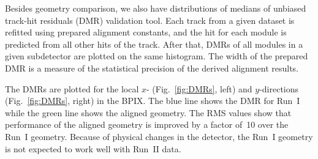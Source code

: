 Besides geometry comparison, we also have distributions of medians of unbiased track-hit residuals (DMR) validation tool. Each track from a given dataset is refitted using prepared alignment constants, and the hit for each module is predicted from all other hits of the track. After that, DMRs of all modules in a given subdetector are plotted on the same histogram. The width of the prepared DMR is a measure of the statistical precision of the derived alignment results. 


The DMRs are plotted for the local $x$- (Fig.~\ref{fig:DMRs}, left) and $y$-directions (Fig.~\ref{fig:DMRs}, right) in the BPIX. The blue line shows the DMR for Run~I while the green line shows the aligned geometry. The RMS values show that performance of the aligned geometry is improved by a factor of~10 over the Run~I geometry. Because of physical changes in the detector, the Run~I geometry is not expected to work well with Run~II data.  

